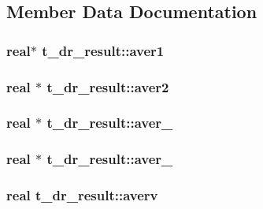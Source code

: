 \subsection{\-Member \-Data \-Documentation}
\hypertarget{structt__dr__result_ab9659096a1bfd3aa817b2ca72172dcac}{
\subsubsection[{aver1}]{\setlength{\rightskip}{0pt plus 5cm}real$\ast$ {\bf t\-\_\-dr\-\_\-result\-::aver1}}}\label{structt__dr__result_ab9659096a1bfd3aa817b2ca72172dcac}
\hypertarget{structt__dr__result_aa54f5131bc6776d56e3582e09236f334}{
\subsubsection[{aver2}]{\setlength{\rightskip}{0pt plus 5cm}real $\ast$ {\bf t\-\_\-dr\-\_\-result\-::aver2}}}\label{structt__dr__result_aa54f5131bc6776d56e3582e09236f334}
\hypertarget{structt__dr__result_a3f1497892c9ba1af84a4176692a6279b}{
\subsubsection[{aver\-\_\-3}]{\setlength{\rightskip}{0pt plus 5cm}real $\ast$ {\bf t\-\_\-dr\-\_\-result\-::aver\-\_}}}\label{structt__dr__result_a3f1497892c9ba1af84a4176692a6279b}
\hypertarget{structt__dr__result_a5273bdeabaf69c0039bbfa5a7fad67a3}{
\subsubsection[{aver\-\_\-6}]{\setlength{\rightskip}{0pt plus 5cm}real $\ast$ {\bf t\-\_\-dr\-\_\-result\-::aver\-\_}}}\label{structt__dr__result_a5273bdeabaf69c0039bbfa5a7fad67a3}
\hypertarget{structt__dr__result_aff5d9306dd4ed0be8e7f10e09152ad1b}{
\subsubsection[{averv}]{\setlength{\rightskip}{0pt plus 5cm}real {\bf t\-\_\-dr\-\_\-result\-::averv}}}\label{structt__dr__result_aff5d9306dd4ed0be8e7f10e09152ad1b}
